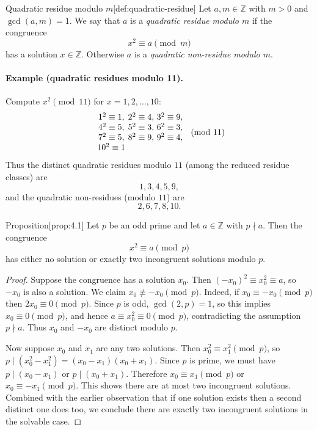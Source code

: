 \documentclass[10pt]{article}
\theoremstyle{definition}
\theoremstyle{plain}
\numberwithin{equation}{section}
\begin{document}
\begin{define}{Quadratic residue modulo $m$}[def:quadratic-residue]
Let $a,m\in\mathbb{Z}$ with $m>0$ and $\gcd(a,m)=1$. We say that $a$ is a
\emph{quadratic residue modulo $m$} if the congruence
\[
x^2 \equiv a \pmod m
\]
has a solution $x\in\mathbb{Z}$. Otherwise $a$ is a \emph{quadratic
non-residue modulo $m$}.
\end{define}

\paragraph{Example (quadratic residues modulo 11).}
Compute $x^2\pmod{11}$ for $x=1,2,\dots,10$:
\[
\begin{array}{c@{\ }c@{\ }c}
1^2\equiv 1, & 2^2\equiv 4, & 3^2\equiv 9,\\
4^2\equiv 5, & 5^2\equiv 3, & 6^2\equiv 3,\\
7^2\equiv 5, & 8^2\equiv 9, & 9^2\equiv 4,\\
10^2\equiv 1 & &
\end{array}\pmod{11}
\]
Thus the distinct quadratic residues modulo $11$ (among the reduced residue
classes) are
\[
1,3,4,5,9,
\]
and the quadratic non-residues (modulo $11$) are
\[
2,6,7,8,10.
\]







\begin{define}{Proposition}[prop:4.1]
Let $p$ be an odd prime and let $a\in\mathbb{Z}$ with $p\nmid a$. Then the
congruence
\[
x^2\equiv a \pmod p
\]
has either no solution or exactly two incongruent solutions modulo $p$.
\end{define}

\begin{proof}
Suppose the congruence has a solution $x_0$. Then $(-x_0)^2\equiv x_0^2\equiv a$,
so $-x_0$ is also a solution. We claim $x_0\not\equiv -x_0\pmod p$.
Indeed, if $x_0\equiv -x_0\pmod p$ then $2x_0\equiv 0\pmod p$. Since $p$ is
odd, $\gcd(2,p)=1$, so this implies $x_0\equiv 0\pmod p$, and hence
$a\equiv x_0^2\equiv 0\pmod p$, contradicting the assumption $p\nmid a$.
Thus $x_0$ and $-x_0$ are distinct modulo $p$.

Now suppose $x_0$ and $x_1$ are any two solutions. Then
$x_0^2\equiv x_1^2\pmod p$, so $p\mid(x_0^2-x_1^2) = (x_0-x_1)(x_0+x_1)$.
Since $p$ is prime, we must have $p\mid(x_0-x_1)$ or $p\mid(x_0+x_1)$.
Therefore $x_0\equiv x_1\pmod p$ or $x_0\equiv -x_1\pmod p$. This shows there
are at most two incongruent solutions. Combined with the earlier observation
that if one solution exists then a second distinct one does too, we conclude
there are exactly two incongruent solutions in the solvable case.
\end{proof}
\end{document}
